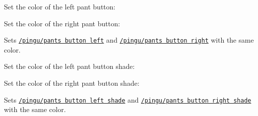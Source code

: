 \documentclass[parskip=half,english,numbers=noenddot,footnotes=nomultiple,oneside]{scrartcl}
\def\lpingu#1{\lstinline[style=lstpingu,language=pingulang]'#1'}
\newcommand*\keyref[2][/pingu/]{\hyperref[pk:#1#2]{\lpingu{#1#2}}}
\begin{document}
Set the color of the left pant button:
\begin{tcblisting}{}
\begin{tikzpicture}
	\pingu[pants, pants button left=green]
\end{tikzpicture}
\end{tcblisting}
\endsubkeyexplain

Set the color of the right pant button:
\begin{tcblisting}{}
\begin{tikzpicture}
	\pingu[pants, pants button right=green]
\end{tikzpicture}
\end{tcblisting}
\endsubkeyexplain

Sets \keyref{pants button left} and \keyref{pants button right} with the same color.
\begin{tcblisting}{}
\begin{tikzpicture}
	\pingu[pants, pants buttons=green]
\end{tikzpicture}
\end{tcblisting}
\endsubkeyexplain

{\def\pingu@color@pants@button@left{<left-button-color>}%
Set the color of the left pant button shade:
\begin{tcblisting}{}
\begin{tikzpicture}
	\pingu[pants,
	       pants button left shade=green]
\end{tikzpicture}
\end{tcblisting}
\endsubkeyexplain}

{\def\pingu@color@pants@button@left{<right-button-color>}%
Set the color of the right pant button shade:
\begin{tcblisting}{}
\begin{tikzpicture}
	\pingu[pants,
	       pants button right shade=green]
\end{tikzpicture}
\end{tcblisting}
\endsubkeyexplain}

{\def\pingu@color@pants@button@left{<left-button-color>}%
Sets \keyref{pants button left shade} and \keyref{pants button right shade} with the same color.
\begin{tcblisting}{}
\begin{tikzpicture}
	\pingu[pants, pants buttons shade=green]
\end{tikzpicture}
\end{tcblisting}
\endsubkeyexplain}
\end{document}
